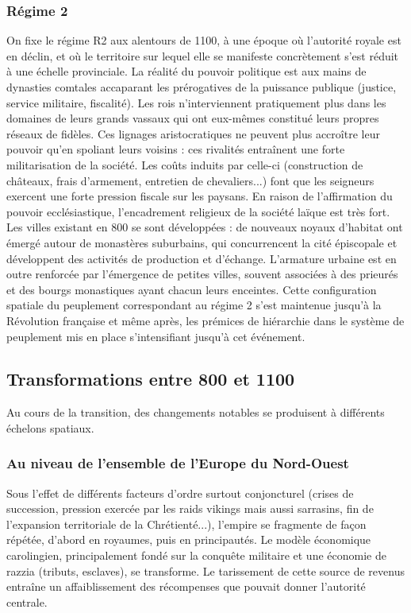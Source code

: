 \subsubsection{Régime 2}
On fixe le régime R2 aux alentours de 1100, à une époque où l'autorité royale est en déclin, et où le territoire sur lequel elle se manifeste concrètement s'est réduit à une échelle provinciale.
La réalité du pouvoir politique est aux mains de dynasties comtales accaparant les prérogatives de la puissance publique (justice, service militaire, fiscalité).
Les rois n'interviennent pratiquement plus dans les domaines de leurs grands vassaux qui ont eux-mêmes constitué leurs propres réseaux de fidèles.
Ces lignages aristocratiques ne peuvent plus accroître leur pouvoir qu'en spoliant leurs voisins : ces rivalités entraînent une forte militarisation de la société.
Les coûts induits par celle-ci (construction de châteaux, frais d'armement, entretien de chevaliers...) font que les seigneurs exercent une forte pression fiscale sur les paysans.
En raison de l'affirmation du pouvoir ecclésiastique, l'encadrement religieux de la société laïque est très fort.
Les villes existant en 800 se sont développées : de nouveaux noyaux d'habitat ont émergé autour de monastères suburbains, qui concurrencent la cité épiscopale et développent des activités de production et d'échange.
L'armature urbaine est en outre renforcée par l'émergence de petites villes, souvent associées à des prieurés et des bourgs monastiques ayant chacun leurs enceintes.
Cette configuration spatiale du peuplement correspondant au régime 2 s'est maintenue jusqu'à la Révolution française et même après, les prémices de hiérarchie dans le système de peuplement mis en place s'intensifiant jusqu'à cet événement.


\subsection{Transformations entre 800 et 1100}

Au cours de la transition, des changements notables se produisent à différents échelons spatiaux.

\subsubsection{Au niveau de l'ensemble de l'Europe du Nord-Ouest}

Sous l'effet de différents facteurs d'ordre surtout conjoncturel (crises de succession, pression exercée par les raids vikings mais aussi sarrasins, fin de l'expansion territoriale de la Chrétienté...), l'empire se fragmente de façon répétée, d'abord en royaumes, puis en principautés.
Le modèle économique carolingien, principalement fondé sur la conquête militaire et une économie de razzia (tributs, esclaves), se transforme.
Le tarissement de cette source de revenus entraîne un affaiblissement des récompenses que pouvait donner l'autorité centrale.



